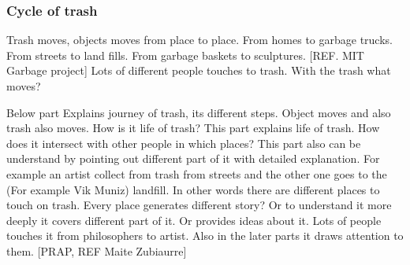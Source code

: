 \documentclass[12pt]{article}
\begin{document}
%
\subsubsection{Cycle of trash}
Trash moves, objects moves from place to place. From homes to garbage trucks. From streets to land fills. From garbage baskets to sculptures. [REF. MIT Garbage project] Lots of different people touches to trash. With the trash what moves?

Below part Explains journey of trash, its different steps. Object moves and also trash also moves. How is it life of trash? This part explains life of trash. How does it intersect with other people in which places? This part also can be understand by pointing out different part of it with detailed explanation. For example an artist collect from trash from streets and the other one goes to the (For example Vik Muniz) landfill. In other words there are different places to touch on trash. Every place generates different story? Or to understand it more deeply it covers different part of it. Or provides ideas about it. Lots of people touches it from philosophers to artist. Also in the later parts it draws attention to them. [PRAP, REF Maite Zubiaurre]
\end{document}
